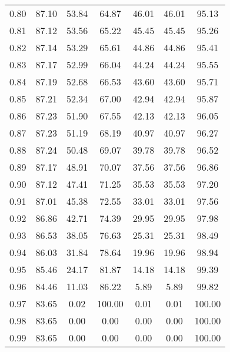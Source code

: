 \begin{tabular}{|c|c|c|c|c|c|c|}
      0.80 &     87.10 &     53.84 &      64.87 &   46.01 &      46.01 &         95.13 \\
      0.81 &     87.12 &     53.56 &      65.22 &   45.45 &      45.45 &         95.26 \\
      0.82 &     87.14 &     53.29 &      65.61 &   44.86 &      44.86 &         95.41 \\
      0.83 &     87.17 &     52.99 &      66.04 &   44.24 &      44.24 &         95.55 \\
      0.84 &     87.19 &     52.68 &      66.53 &   43.60 &      43.60 &         95.71 \\
      0.85 &     87.21 &     52.34 &      67.00 &   42.94 &      42.94 &         95.87 \\
      0.86 &     87.23 &     51.90 &      67.55 &   42.13 &      42.13 &         96.05 \\
      0.87 &     87.23 &     51.19 &      68.19 &   40.97 &      40.97 &         96.27 \\
      0.88 &     87.24 &     50.48 &      69.07 &   39.78 &      39.78 &         96.52 \\
      0.89 &     87.17 &     48.91 &      70.07 &   37.56 &      37.56 &         96.86 \\
      0.90 &     87.12 &     47.41 &      71.25 &   35.53 &      35.53 &         97.20 \\
      0.91 &     87.01 &     45.38 &      72.55 &   33.01 &      33.01 &         97.56 \\
      0.92 &     86.86 &     42.71 &      74.39 &   29.95 &      29.95 &         97.98 \\
      0.93 &     86.53 &     38.05 &      76.63 &   25.31 &      25.31 &         98.49 \\
      0.94 &     86.03 &     31.84 &      78.64 &   19.96 &      19.96 &         98.94 \\
      0.95 &     85.46 &     24.17 &      81.87 &   14.18 &      14.18 &         99.39 \\
      0.96 &     84.46 &     11.03 &      86.22 &    5.89 &       5.89 &         99.82 \\
      0.97 &     83.65 &      0.02 &     100.00 &    0.01 &       0.01 &        100.00 \\
      0.98 &     83.65 &      0.00 &       0.00 &    0.00 &       0.00 &        100.00 \\
      0.99 &     83.65 &      0.00 &       0.00 &    0.00 &       0.00 &        100.00 \\
\bottomrule
\end{tabular}
